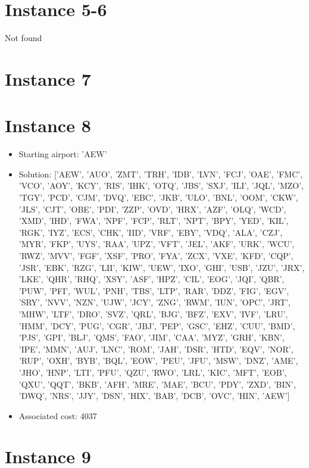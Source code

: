 \section*{Instance 5-6}

Not found

\section*{Instance 7}
\section*{Instance 8}
\begin{itemize}
    \item Starting airport: 'AEW'
    \item Solution: ['AEW', 'AUO', 'ZMT', 'TRH', 'IDB', 'LVN', 'FCJ', 'OAE', 'FMC', 'VCO', 'AOY', 'KCY', 'RIS', 'IHK', 'OTQ', 'JBS', 'SXJ', 'ILI', 'JQL', 'MZO', 'TGY', 'PCD', 'CJM', 'DVQ', 'EBC', 'JKB', 'ULO', 'BNL', 'OOM', 'CKW', 'JLS', 'CJT', 'OBE', 'PDI', 'ZZP', 'OVD', 'HRX', 'AZF', 'OLQ', 'WCD', 'XMD', 'IHD', 'FWA', 'NPF', 'FCP', 'RLT', 'NPT', 'BPY', 'YED', 'KIL', 'RGK', 'IYZ', 'ECS', 'CHK', 'IID', 'VRF', 'EBY', 'VDQ', 'ALA', 'CZJ', 'MYR', 'FKP', 'UYS', 'RAA', 'UPZ', 'VFT', 'JEL', 'AKF', 'URK', 'WCU', 'RWZ', 'MVV', 'FGF', 'XSF', 'PRO', 'FYA', 'ZCX', 'VXE', 'KFD', 'CQP', 'JSR', 'EBK', 'RZG', 'LII', 'KIW', 'UEW', 'IXO', 'GHI', 'USB', 'JZU', 'JRX', 'LKE', 'QHR', 'RHQ', 'XSY', 'ASF', 'HPZ', 'CIL', 'EOG', 'JQI', 'QBR', 'PUW', 'PFI', 'WUL', 'PNH', 'TBS', 'LTP', 'RAR', 'DDZ', 'FIG', 'EGV', 'SRY', 'NVV', 'NZN', 'UJW', 'JCY', 'ZNG', 'RWM', 'IUN', 'OPC', 'JRT', 'MHW', 'LTF', 'DRO', 'SVZ', 'QRL', 'BJG', 'BFZ', 'EXV', 'IVF', 'LRU', 'HMM', 'DCY', 'PUG', 'CGR', 'JBJ', 'PEP', 'GSC', 'EHZ', 'CUU', 'BMD', 'PJS', 'GPI', 'BLJ', 'QMS', 'FAO', 'JIM', 'CAA', 'MYZ', 'GRH', 'KBN', 'IPE', 'MMN', 'AUJ', 'LNC', 'ROM', 'JAH', 'DSR', 'HTD', 'EQV', 'NOR', 'RUP', 'OXH', 'BYB', 'BQL', 'EOW', 'PEU', 'JFU', 'MSW', 'DNZ', 'AME', 'JHO', 'HNP', 'LTI', 'PFU', 'QZU', 'RWO', 'LRL', 'KIC', 'MFT', 'EOB', 'QXU', 'QQT', 'BKB', 'AFH', 'MRE', 'MAE', 'BCU', 'PDY', 'ZXD', 'BIN', 'DWQ', 'NRS', 'JJY', 'DSN', 'HIX', 'BAB', 'DCB', 'OVC', 'HIN', 'AEW']
    \item Associated cost: 4037
\end{itemize}
\section*{Instance 9}


